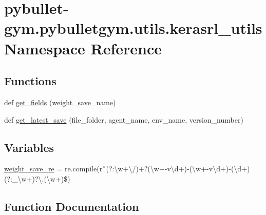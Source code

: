 \hypertarget{namespacepybullet-gym_1_1pybulletgym_1_1utils_1_1kerasrl__utils}{}\section{pybullet-\/gym.pybulletgym.\+utils.\+kerasrl\+\_\+utils Namespace Reference}
\label{namespacepybullet-gym_1_1pybulletgym_1_1utils_1_1kerasrl__utils}
\subsection*{Functions}
\begin{DoxyCompactItemize}
\item 
def \hyperlink{namespacepybullet-gym_1_1pybulletgym_1_1utils_1_1kerasrl__utils_afc8debafd596ce56e73232caa651a182}{get\+\_\+fields} (weight\+\_\+save\+\_\+name)
\item 
def \hyperlink{namespacepybullet-gym_1_1pybulletgym_1_1utils_1_1kerasrl__utils_a2b44bbf2bbe8812035811f4558ec2b2e}{get\+\_\+latest\+\_\+save} (file\+\_\+folder, agent\+\_\+name, env\+\_\+name, version\+\_\+number)
\end{DoxyCompactItemize}
\subsection*{Variables}
\begin{DoxyCompactItemize}
\item 
\hyperlink{namespacepybullet-gym_1_1pybulletgym_1_1utils_1_1kerasrl__utils_a2dc88ba5a7e631ef64f783b379061de7}{weight\+\_\+save\+\_\+re} = re.\+compile(r\textquotesingle{}$^\wedge$(?\+:\textbackslash{}w+\textbackslash{}/)+?(\textbackslash{}w+-\/v\textbackslash{}d+)-\/(\textbackslash{}w+-\/v\textbackslash{}d+)-\/(\textbackslash{}d+)(?\+:\+\_\+\textbackslash{}w+)?\textbackslash{}.(\textbackslash{}w+)\$\textquotesingle{})
\end{DoxyCompactItemize}


\subsection{Function Documentation}
